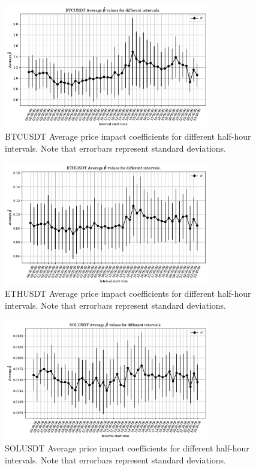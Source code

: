 \clearpage

\begin{figure}[htpb]
    \centering
    \includegraphics[width=0.8\textwidth]{./images/BTCUSDT_beta_across_time.pdf}
    \caption{BTCUSDT Average price impact coefficients for different half-hour intervals. Note that errorbars represent standard deviations.}
    \label{fig:BTCUSDT_beta_across_time}
\end{figure}


\begin{figure}[htpb]
    \centering
    \includegraphics[width=0.8\textwidth]{./images/ETHUSDT_beta_across_time.pdf}
    \caption{ETHUSDT Average price impact coefficients for different half-hour intervals. Note that errorbars represent standard deviations.}
\end{figure}

\begin{figure}[htpb]
    \centering
    \includegraphics[width=0.8\textwidth]{./images/SOLUSDT_beta_across_time.pdf}
    \caption{SOLUSDT Average price impact coefficients for different half-hour intervals. Note that errorbars represent standard deviations.}
\end{figure}

